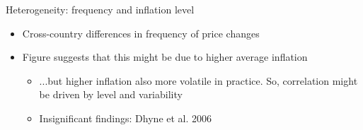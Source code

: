 \documentclass{beamer}
\begin{document}
\begin{frame}{Heterogeneity: frequency and inflation level}

\begin{itemize}
\small
\item Cross-country differences in frequency of price changes
\item Figure suggests that this might be due to higher average inflation
\begin{itemize}
\small
\item ...but higher inflation also more volatile in practice. So, correlation might be driven by level and variability
\item Insignificant findings: Dhyne et al. 2006
\end{itemize}
\end{itemize}

\begin{center}

\begin{figure}[h!]

\end{figure}

\end{center}

\end{frame}
\end{document}
